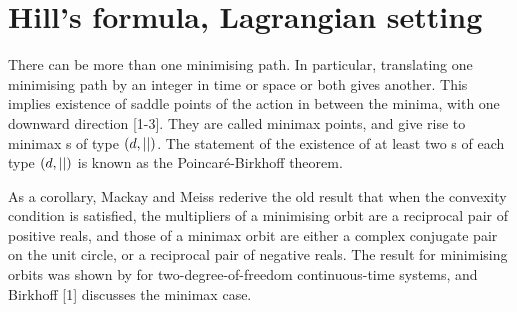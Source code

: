 


\section{Hill's formula, Lagrangian setting}
\label{sect:HillLagr}

%
There can be more than one minimising path. In particular,
translating one minimising path by an integer in time or space or both gives
another. This implies existence of saddle points of the action in between the
minima, with one downward direction [1-3]. They are called minimax points, and
give rise to minimax \po s of type $(d,{||})$. The statement of the existence of
at least two \po s of each type  $(d,{||})$ is known as the Poincar\'e-Birkhoff
theorem.

As a corollary, Mackay and Meiss rederive the old result
that when the convexity condition is satisfied, the multipliers of a
minimising orbit are a reciprocal pair of positive reals, and those of a
minimax orbit are either a complex conjugate pair on the unit circle, or
a reciprocal pair of negative reals. The result for minimising orbits was
shown by \Poincare{} for two-degree-of-freedom
continuous-time systems, and Birkhoff [1] discusses the minimax case.


